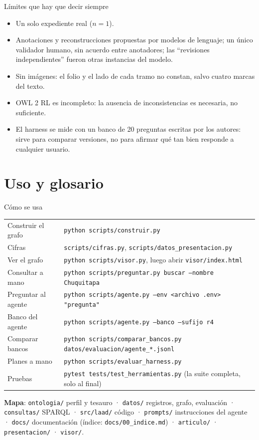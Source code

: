 \documentclass[aspectratio=169,10pt]{beamer}
\newcommand{\ttt}[1]{\texttt{\small #1}}
\begin{document}
\begin{frame}{Límites que hay que decir siempre}
\begin{itemize}
\item Un solo expediente real ($n=1$).
\item Anotaciones y reconstrucciones propuestas por modelos de lenguaje; un único validador humano, sin acuerdo
      entre anotadores; las \enquote{revisiones independientes} fueron otras instancias del modelo.
\item Sin imágenes: el folio y el lado de cada tramo no constan, salvo cuatro marcas del texto.
\item OWL 2 RL es incompleto: la ausencia de inconsistencias es necesaria, no suficiente.
\item El harness se mide con un banco de 20 preguntas escritas por los autores: sirve para comparar versiones, no
      para afirmar qué tan bien responde a cualquier usuario.
\end{itemize}
\end{frame}

\section{Uso y glosario}

\begin{frame}{Cómo se usa}
\scriptsize
\begin{tabular}{@{}lp{10.4cm}@{}}
\toprule
Construir el grafo & \ttt{python scripts/construir.py} \\
Cifras & \ttt{scripts/cifras.py}, \ttt{scripts/datos\_presentacion.py} \\
Ver el grafo & \ttt{python scripts/visor.py}, luego abrir \ttt{visor/index.html} \\
Consultar a mano & \ttt{python scripts/preguntar.py buscar --nombre Chuquitapa} \\
Preguntar al agente & \ttt{python scripts/agente.py --env <archivo .env> "pregunta"} \\
Banco del agente & \ttt{python scripts/agente.py --banco --sufijo r4} \\
Comparar bancos & \ttt{python scripts/comparar\_bancos.py datos/evaluacion/agente\_*.jsonl} \\
Planes a mano & \ttt{python scripts/evaluar\_harness.py} \\
Pruebas & \ttt{pytest tests/test\_herramientas.py} (la suite completa, solo al final) \\
\bottomrule
\end{tabular}

\medskip
\textbf{Mapa}: \ttt{ontologia/} perfil y tesauro · \ttt{datos/} registros, grafo, evaluación · \ttt{consultas/} SPARQL ·
\ttt{src/laad/} código · \ttt{prompts/} instrucciones del agente · \ttt{docs/} documentación (índice:
\ttt{docs/00\_indice.md}) · \ttt{articulo/} · \ttt{presentacion/} · \ttt{visor/}.
\end{frame}
\end{document}

